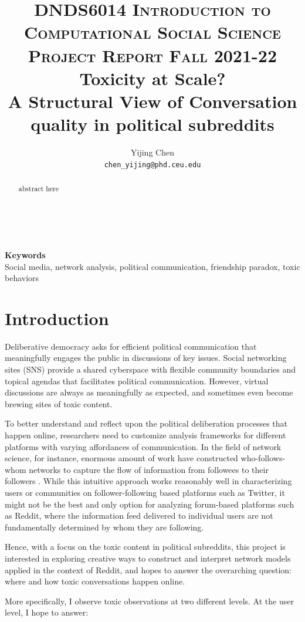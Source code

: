 \documentclass[10pt,twocolumn,letterpaper]{article}
\title{
		\usefont{OT1}{bch}{b}{n}
		\normalfont \normalsize \textsc{DNDS6014 Introduction to Computational Social Science \\ Project Report Fall 2021-22} \\ [10pt]
		\huge Toxicity at Scale?\\ \Large{A Structural View of Conversation quality in political subreddits} \\
}
\author{Yijing Chen \\ \small{\texttt{chen\_yijing@phd.ceu.edu}}}
\begin{document}
\maketitle

\begin{abstract}
abstract here
\end{abstract} \\ 
\\ 
{\textbf{Keywords} \\
Social media, network analysis, political communication, friendship paradox, toxic behaviors}

\section{Introduction}

Deliberative democracy asks for efficient political communication that meaningfully engages the public in discussions of key issues. Social networking sites (SNS) provide a shared cyberspace with flexible community boundaries and topical agendas that facilitates political communication. However, virtual discussions are always as meaningfully as expected, and sometimes even become brewing sites of toxic content. 

To better understand and reflect upon the political deliberation processes that happen online, researchers need to customize analysis frameworks for different platforms with varying affordances of communication. In the field of network science, for instance, enormous amount of work have constructed who-follows-whom networks to capture the flow of information from followees to their followers \cite[e.g.,][]{conover2011political, yang2010predicting, bakshy2011everyone}. While this intuitive approach works reasonably well in characterizing users or communities on follower-following based platforms such as Twitter, it might not be the best and only option for analyzing forum-based platforms such as Reddit, where the information feed delivered to individual users are not fundamentally determined by whom they are following. 

Hence, with a focus on the toxic content in political subreddits, this project is interested in exploring creative ways to construct and interpret network models applied in the context of Reddit, and hopes to answer the overarching question: where and how toxic conversations happen online. 

More specifically, I observe toxic observations at two different levels. At the user level, I hope to answer:
\end{document}

